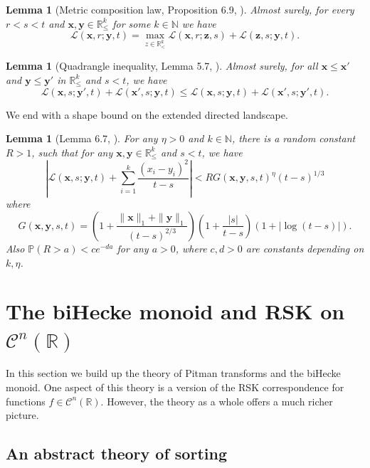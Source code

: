 \documentclass[11pt]{article}
\newcommand{\N}{\mathbb{N}}
\newcommand{\R}{\mathbb{R}}
\newcommand{\p}{\mathbb{P}}
\newcommand{\lf}{\left}
\newcommand{\rg}{\right}
\newcommand{\cC}{\mathcal{C}}
\newcommand{\cL}{\mathcal{L}}
\newcommand{\bx}{\mathbf{x}}
\newcommand{\by}{\mathbf{y}}
\newcommand{\bz}{\mathbf{z}}
\newtheorem{lemma}[theorem]{Lemma}
\theoremstyle{definition} %
\theoremstyle{remark} %
\begin{document}
\begin{lemma}[Metric composition law, Proposition 6.9, \cite{dauvergne2021disjoint}]
	\label{L:split-path-L}
	\label{P:mc-everywhere}
Almost surely, for every $r < s < t$ and $\bx, \by \in \R^k_\le$ for some $k \in \N$ we have
$$
\cL(\bx, r; \by, t) = \max_{z \in \R^k_<} \cL(\bx, r; \bz, s) + 	\cL(\bz, s; \by, t).
$$
\end{lemma}

\begin{lemma}[Quadrangle inequality, Lemma 5.7, \cite{dauvergne2021disjoint}]
	\label{L:quadrangle-landscape}
	Almost surely, for all $\bx \le \bx'$ and $\by \le \by'$ in $\R^k_\le$ and $s < t$, we have
$$
\cL(\bx, s; \by', t) + \cL(\bx', s; \by, t)  \le \cL(\bx, s; \by, t)  + \cL(\bx', s; \by', t).
$$
\end{lemma}

We end with a shape bound on the extended directed landscape.

\begin{lemma}[Lemma 6.7, \cite{dauvergne2021disjoint}]  \label{L:shape-land}
	For any $\eta>0$ and $k\in\N$, there is a random constant $R>1$, such that for any $\bx,\by \in\R^k_\le$ and $s<t$, we have
	$$
	\lf|\cL(\bx,s;\by,t) + \sum_{i=1}^k \frac{(x_i - y_i)^2}{t-s}\rg| < RG(\bx,\by,s,t)^{\eta} (t-s)^{1/3}
	$$
	where
	$$
	G(\bx,\by,s,t) = \lf(1+\frac{\|\bx\|_1+\|\by\|_1}{(t-s)^{2/3}}\rg)\lf(1+\frac{|s|}{t-s}\rg)(1+|\log(t-s)|).
	$$
	Also $\p(R>a) < ce^{-da}$ for any $a>0$, where $c, d > 0$ are constants depending on $k,\eta$.
\end{lemma}





\section{The biHecke monoid and RSK on \texorpdfstring{$\cC^n(\R)$}{}}
\label{S:sorting-monoids}

In this section we build up the theory of Pitman transforms and the biHecke monoid. One aspect of this theory is a version of the RSK correspondence for functions $f \in \cC^n(\R)$. However, the theory as a whole offers a much richer picture.

\subsection{An abstract theory of sorting}
\end{document}
